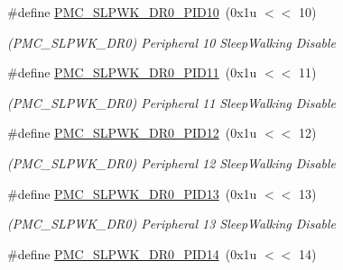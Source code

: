 \begin{DoxyCompactItemize}
\mbox{\label{group__SAME70__PMC_gaf464ad11065a7306faad9bd70430b4ea}} 
\#define \mbox{\hyperlink{group__SAME70__PMC_gaf464ad11065a7306faad9bd70430b4ea}{P\+M\+C\+\_\+\+S\+L\+P\+W\+K\+\_\+\+D\+R0\+\_\+\+P\+I\+D10}}~(0x1u $<$$<$ 10)
\begin{DoxyCompactList}\small\item\em (P\+M\+C\+\_\+\+S\+L\+P\+W\+K\+\_\+\+D\+R0) Peripheral 10 Sleep\+Walking Disable \end{DoxyCompactList}\item 
\mbox{\label{group__SAME70__PMC_ga07869d56d5406e7d90408c1a23aa5e6c}} 
\#define \mbox{\hyperlink{group__SAME70__PMC_ga07869d56d5406e7d90408c1a23aa5e6c}{P\+M\+C\+\_\+\+S\+L\+P\+W\+K\+\_\+\+D\+R0\+\_\+\+P\+I\+D11}}~(0x1u $<$$<$ 11)
\begin{DoxyCompactList}\small\item\em (P\+M\+C\+\_\+\+S\+L\+P\+W\+K\+\_\+\+D\+R0) Peripheral 11 Sleep\+Walking Disable \end{DoxyCompactList}\item 
\mbox{\label{group__SAME70__PMC_ga5190bf95bc37a6b05d1a669664b3d4fd}} 
\#define \mbox{\hyperlink{group__SAME70__PMC_ga5190bf95bc37a6b05d1a669664b3d4fd}{P\+M\+C\+\_\+\+S\+L\+P\+W\+K\+\_\+\+D\+R0\+\_\+\+P\+I\+D12}}~(0x1u $<$$<$ 12)
\begin{DoxyCompactList}\small\item\em (P\+M\+C\+\_\+\+S\+L\+P\+W\+K\+\_\+\+D\+R0) Peripheral 12 Sleep\+Walking Disable \end{DoxyCompactList}\item 
\mbox{\label{group__SAME70__PMC_ga5a77c1b7943aa2544f0543c6e9a39e28}} 
\#define \mbox{\hyperlink{group__SAME70__PMC_ga5a77c1b7943aa2544f0543c6e9a39e28}{P\+M\+C\+\_\+\+S\+L\+P\+W\+K\+\_\+\+D\+R0\+\_\+\+P\+I\+D13}}~(0x1u $<$$<$ 13)
\begin{DoxyCompactList}\small\item\em (P\+M\+C\+\_\+\+S\+L\+P\+W\+K\+\_\+\+D\+R0) Peripheral 13 Sleep\+Walking Disable \end{DoxyCompactList}\item 
\mbox{\label{group__SAME70__PMC_ga2fda27a3f63352ad94ffa139e673ce3b}} 
\#define \mbox{\hyperlink{group__SAME70__PMC_ga2fda27a3f63352ad94ffa139e673ce3b}{P\+M\+C\+\_\+\+S\+L\+P\+W\+K\+\_\+\+D\+R0\+\_\+\+P\+I\+D14}}~(0x1u $<$$<$ 14)
$$
\end{DoxyCompactItemize}
